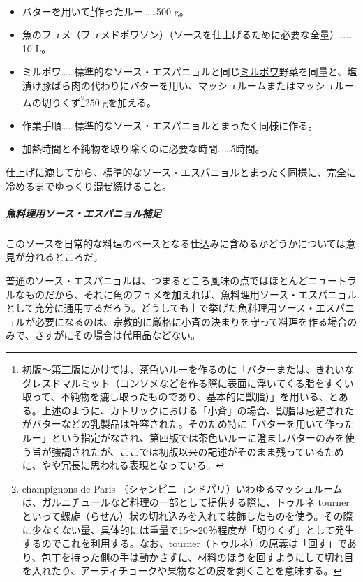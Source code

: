 \begin{recette}
\begin{itemize}
\item
  バターを用いて\footnote{初版〜第三版にかけては、茶色いルーを作るのに「バターまたは、きれいなグレスドマルミット（コンソメなどを作る際に表面に浮いてくる脂をすくい取って、不純物を漉し取ったものであり、基本的に獣脂）」を用いる、とある。上述のように、カトリックにおける「小斉」の場合、獣脂は忌避されたがバターなどの乳製品は許容された。そのため特に「バターを用いて作ったルー」という指定がなされ、第四版では茶色いルーに澄ましバターのみを使う旨が強調されたが、ここでは初版以来の記述がそのまま残っているために、やや冗長に思われる表現となっている。}作ったルー\ldots{}\ldots{}500
  g。
\item
  魚のフュメ（フュメドポワソン）（ソースを仕上げるために必要な全量）\ldots{}\ldots{}10
  L。
\item
  ミルポワ\ldots{}\ldots{}標準的なソース・エスパニョルと同じ\protect\hyperlink{mirepoix}{ミルポワ}野菜を同量と、塩漬け豚ばら肉の代わりにバターを用い、マッシュルームまたはマッシュルームの切りくず\footnote{champignons
    de Paris
    （シャンピニョンドパリ）いわゆるマッシュルームは、ガルニチュールなど料理の一部として提供する際に、トゥルネ
    tourner
    といって螺旋（らせん）状の切れ込みを入れて装飾したものを使う。その際に少なくない量、具体的には重量で15〜20％程度が「切りくず」として発生するのでこれを利用する。なお、tourner（トゥルネ）の原義は「回す」であり、包丁を持った側の手は動かさずに、材料のほうを回すようにして切れ目を入れたり、アーティチョークや果物などの皮を剥くことを意味する。}250
  gを加える。
\item
  作業手順\ldots{}\ldots{}標準的なソース・エスパニョルとまったく同様に作る。
\item
  加熱時間と不純物を取り除くのに必要な時間\ldots{}\ldots{}5時間。
\end{itemize}

仕上げに漉してから、標準的なソース・エスパニョルとまったく同様に、完全に冷めるまでゆっくり混ぜ続けること。

\hypertarget{observation-sauce-espagnole-maigre}{%
\subparagraph{魚料理用ソース・エスパニョル補足}\label{observation-sauce-espagnole-maigre}}

このソースを日常的な料理のベースとなる仕込みに含めるかどうかについては意見が分れるところだ。

普通のソース・エスパニョルは、つまるところ風味の点ではほとんどニュートラルなものだから、それに魚のフュメを加えれば、魚料理用ソース・エスパニョルとして充分に通用するだろう。どうしても上で挙げた魚料理用ソース・エスパニョルが必要になるのは、宗教的に厳格に小斉の決まりを守って料理を作る場合のみで、さすがにその場合は代用品などない。


\end{recette}
